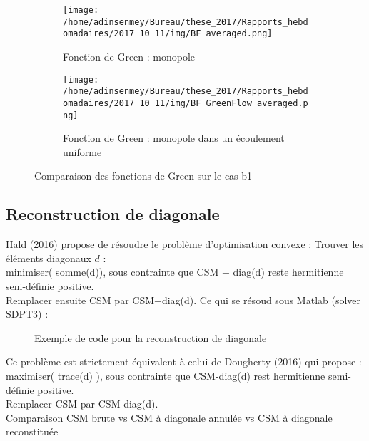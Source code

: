 \documentclass[twocolumn, 11pt, landscape]{article}
\begin{document}
\begin{figure}[!h]
	\begin{subfigure}[b]{0.22\textwidth}
		\texttt{[image: /home/adinsenmey/Bureau/these\_2017/Rapports\_hebdomadaires/2017\_10\_11/img/BF\_averaged.png]}
		\caption{Fonction de Green : monopole}
	\end{subfigure}
	\hfill
	\begin{subfigure}[b]{0.22\textwidth}
		\texttt{[image: /home/adinsenmey/Bureau/these\_2017/Rapports\_hebdomadaires/2017\_10\_11/img/BF\_GreenFlow\_averaged.png]}
		\caption{Fonction de Green : monopole dans un écoulement uniforme}
	\end{subfigure}
	\caption{Comparaison des fonctions de Green sur le cas b1}
	\label{green}
\end{figure}


\subsection{Reconstruction de diagonale}

Hald (2016) propose de résoudre le problème d'optimisation convexe : 
Trouver les éléments diagonaux $d$ : \\
minimiser( somme(d)), sous contrainte que  CSM + diag(d)  reste hermitienne seni-définie positive.\\
Remplacer ensuite CSM par CSM+diag(d).
Ce qui se résoud sous Matlab (solver SDPT3)  : 
\begin{figure}[!h]
	\centering
	\caption{Exemple de code pour la reconstruction de diagonale}
\end{figure}

Ce problème est strictement équivalent à celui de Dougherty (2016) qui propose :\\
maximiser( trace(d) ), sous contrainte que CSM-diag(d) rest hermitienne semi-définie positive.\\
Remplacer CSM par CSM-diag(d).\\

Comparaison CSM brute vs CSM à diagonale annulée vs CSM à diagonale reconstituée
\end{document}
